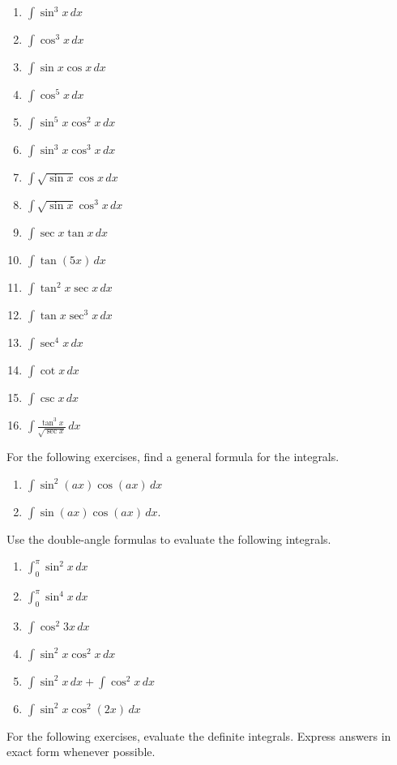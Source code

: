 \documentclass{exercises}
\begin{document}
\begin{enumerate}[resume]
\item $\int \sin^{3}x\,dx$
\item $\int \cos^{3}x\,dx$
\item $\int \sin x\cos x\,dx$
\item $\int \cos^{5}x\,dx$
\item $\int \sin^{5}x\cos^{2}x\,dx$
\item $\int \sin^{3}x\cos^{3}x\,dx$
\item $\int \sqrt{\sin x}\cos x\,dx$
\item $\int \sqrt{\sin x}\cos^{3}x\,dx$
\item $\int \sec x\tan x\,dx$
\item $\int \tan(5x)\,dx$
\item $\int \tan^{2}x\sec x\,dx$
\item $\int \tan x\sec^{3}x\,dx$
\item $\int \sec^{4}x\,dx$
\item $\int \cot x\,dx$
\item $\int \csc x\,dx$
\item $\int \frac{\tan^{3}x}{\sqrt{\sec x}}\,dx$
\end{enumerate}

For the following exercises, find a general formula for the integrals.

\begin{enumerate}[resume]
\item $\int \sin^{2}(ax)\cos(ax)\,dx$
\item $\int \sin(ax)\cos(ax)\,dx$.
\end{enumerate}

Use the double-angle formulas to evaluate the following integrals.

\begin{enumerate}[resume]
\item $\int_{0}^{\pi}\sin^{2}x\,dx$
\item $\int_{0}^{\pi}\sin^{4}x\,dx$
\item $\int \cos^{2}3x\,dx$
\item $\int \sin^{2}x\cos^{2}x\,dx$
\item $\int \sin^{2}x\,dx+\int \cos^{2}x\,dx$
\item $\int \sin^{2}x\cos^{2}(2x)\,dx$
\end{enumerate}

For the following exercises, evaluate the definite integrals. Express answers in exact form whenever possible.
\end{document}
